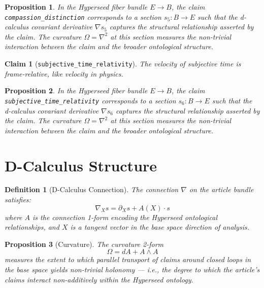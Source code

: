 \documentclass{article}
\newtheorem{claim}{Claim}
\newtheorem{definition}{Definition}
\newtheorem{proposition}{Proposition}
\begin{document}
\begin{proposition}
In the Hyperseed fiber bundle $E \to B$, the claim \texttt{compassion_distinction} corresponds to a section $s_5: B \to E$ such that the d-calculus covariant derivative $\nabla s_5$ captures the structural relationship asserted by the claim. The curvature $\Omega = \nabla^2$ at this section measures the non-trivial interaction between the claim and the broader ontological structure.
\end{proposition}

\begin{claim}[\texttt{subjective_time_relativity}]
The velocity of subjective time is frame-relative, like velocity in physics.
\end{claim}

\begin{proposition}
In the Hyperseed fiber bundle $E \to B$, the claim \texttt{subjective_time_relativity} corresponds to a section $s_6: B \to E$ such that the d-calculus covariant derivative $\nabla s_6$ captures the structural relationship asserted by the claim. The curvature $\Omega = \nabla^2$ at this section measures the non-trivial interaction between the claim and the broader ontological structure.
\end{proposition}

\section{D-Calculus Structure}

\begin{definition}[D-Calculus Connection]
The connection $\nabla$ on the article bundle satisfies:
\begin{equation}
  \nabla_X s = \partial_X s + A(X) \cdot s
\end{equation}
where $A$ is the connection 1-form encoding the Hyperseed ontological relationships, and $X$ is a tangent vector in the base space direction of analysis.
\end{definition}

\begin{proposition}[Curvature]
The curvature 2-form
\begin{equation}
  \Omega = dA + A \wedge A
\end{equation}
measures the extent to which parallel transport of claims around closed loops in the base space yields non-trivial holonomy --- i.e., the degree to which the article's claims interact non-additively within the Hyperseed ontology.
\end{proposition}
\end{document}
